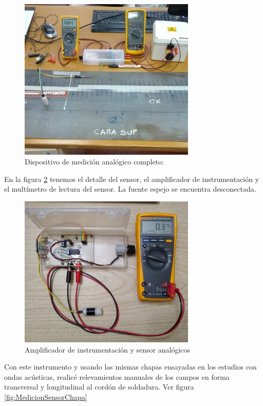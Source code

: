 \begin{figure}[H]
    \centering
    \includegraphics[width=0.75\textwidth]{./Figures/SensorYAmplificadorYChapa}
	\caption{Dispositivo de medición analógico completo: }
	\label{fig:SensorYAmplificadorYChapa}
 \end{figure}


En la figura \ref{fig:SensorYAmplificador} tenemos el detalle del sensor, el amplificador de instrumentación y el multímetro de lectura del sensor. La fuente espejo se encuentra desconectada.

\begin{figure}[htpb]
    \centering
    \includegraphics[width=0.75\textwidth]{./Figures/SensorYAmplificadorHR}
	\caption{Amplificador de instrumentación y sensor analógicos }
	\label{fig:SensorYAmplificador}
 \end{figure}

Con este instrumento y usando las mismas chapas ensayadas en los estudios con ondas acústicas, realicé relevamientos manuales de los campos en forma transversal y longitudinal al cordón de soldadura. Ver figura \ref{fig:MedicionSensorChapa} 

